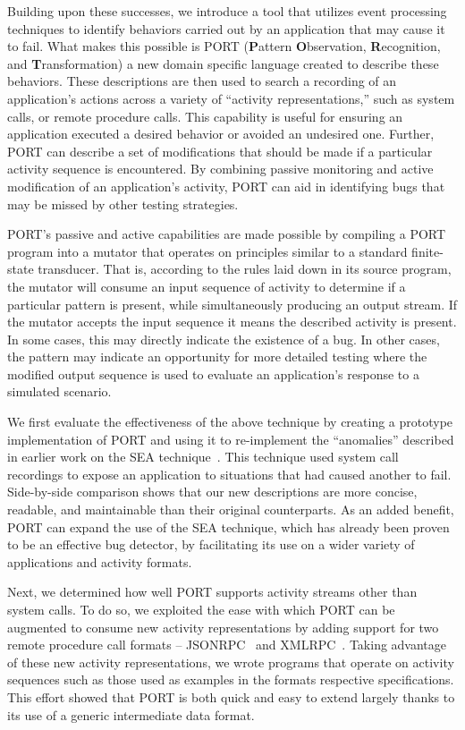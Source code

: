 Building upon these successes,
we introduce a tool
that utilizes event processing techniques
to identify
behaviors carried out by an application
that may cause it to fail.
What makes this possible is PORT
(\textbf{P}attern \textbf{O}bservation, \textbf{R}ecognition, and
\textbf{T}ransformation)
a new domain specific language
created to describe these behaviors.
These descriptions are then used
to search a recording of an application's actions
across a variety of ``activity representations,''
such as system calls,
or remote procedure calls.
This capability is useful
for ensuring an application executed a desired behavior
or avoided an undesired one.
Further, PORT can describe
a set of modifications
that should be made
if a particular activity sequence is encountered.
By combining passive monitoring and active modification
of an application's activity,
PORT can aid in identifying bugs
that may be missed by other testing strategies.

PORT's passive and active capabilities are made possible
by compiling a PORT program
into a mutator
that operates on principles similar
to a standard finite-state transducer.
That is,
according to the rules laid down in its source program,
the mutator will consume an input sequence of activity
to determine if a particular pattern is present,
while simultaneously producing an output stream.
If the mutator accepts the input sequence
it means the described activity is present.
In some cases,
this may directly indicate
the existence of a bug.
In other cases,
the pattern may
indicate an opportunity
for more detailed testing
where the modified output sequence is used
to evaluate an application's response to a simulated scenario.

We first evaluate the effectiveness of the above technique
by creating a prototype implementation of PORT
and using it to
re-implement the ``anomalies''
described in earlier work on the SEA technique~\cite{DBLP:conf/issre/MooreCFW19}.
This technique used system call recordings
to expose an application to situations that had caused another to fail.
Side-by-side comparison shows that our new
descriptions are more concise,
readable,
and maintainable
than their original counterparts.
As an added benefit,
PORT can expand the use of the SEA technique,
which has already been proven
to be an effective bug detector,
by facilitating its use
on a wider variety of applications and activity formats.

Next, we
determined how well PORT
supports activity streams
other than system calls.
To do so,
we exploited the ease with which
PORT can be augmented
to consume new activity representations
by adding support for two remote procedure call formats --
JSONRPC~\cite{jsonspec} and XMLRPC~\cite{xmlspec}.
Taking advantage of these new activity representations,
we wrote programs that operate on activity sequences such as those
used as examples in the formats respective specifications.
This effort
showed that PORT is both quick and easy to extend largely thanks to its
use of a generic intermediate data format.

